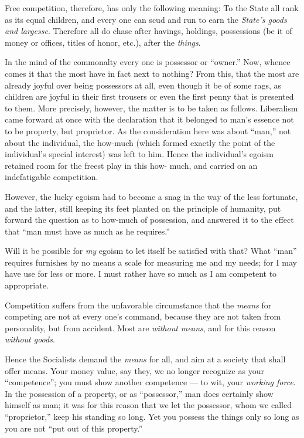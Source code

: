 Free competition, therefore, has only the following meaning: To the State all 
rank as its equal children, and every one can scud and run to earn the 
\textit{State's goods and largesse}. Therefore all do chase after havings, 
holdings, possessions (be it of money or offices, titles of honor, etc.), 
after the \textit{things}.

In the mind of the commonalty every one is possessor or ``owner.'' Now, 
whence comes it that the most have in fact next to nothing? From this, that 
the most are already joyful over being possessors at all, even though it be of 
some rags, as children are joyful in their first trousers or even the first 
penny that is presented to them. More precisely, however, the matter is to be 
taken as follows. Liberalism came forward at once with the declaration that it 
belonged to man's essence not to be property, but proprietor. As the 
consideration here was about ``man,'' not about the individual, the how-much 
(which formed exactly the point of the individual's special interest) was left 
to him. Hence the individual's egoism retained room for the freest play in 
this how- much, and carried on an indefatigable competition.

However, the lucky egoism had to become a snag in the way of the less 
fortunate, and the latter, still keeping its feet planted on the principle of 
humanity, put forward the question as to how-much of possession, and answered 
it to the effect that ``man must have as much as he requires.''

Will it be possible for \textit{my} egoism to let itself be satisfied with 
that? What ``man'' requires furnishes by no means a scale for measuring me 
and my needs; for I may have use for less or more. I must rather have so much 
as I am competent to appropriate.

Competition suffers from the unfavorable circumstance that the \textit{means} 
for competing are not at every one's command, because they are not taken from 
personality, but from accident. Most are \textit{without means}, and for this 
reason \textit{without goods}.

Hence the Socialists demand the \textit{means} for all, and aim at a society 
that shall offer means. Your money value, say they, we no longer recognize as 
your ``competence''; you must show another competence --- to wit, your 
\textit{working force}. In the possession of a property, or as 
``possessor,'' man does certainly show himself as man; it was for this 
reason that we let the possessor, whom we called ``proprietor,'' keep his 
standing so long. Yet you possess the things only so long as you are not 
``put out of this property.''

